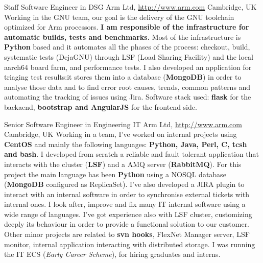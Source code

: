 \documentclass[10pt,a4paper,sans]{moderncv}
\begin{document}
    {Staff Software Engineer in DSG}
    {Arm Ltd, \url{http://www.arm.com}}
    {Cambridge, UK}{}
    {Working in the GNU team, our goal is the delivery of the GNU toolchain
    optimized for Arm processors. \textbf{I am responsible of the
    infrastructure for automatic builds, tests and benchmarks.} Most of the
    infrastructure is \textbf{Python} based and it automates all the phases of
    the process: checkout, build, systematic tests (DejaGNU) through LSF (Load
    Sharing Facility) and the local aarch64 board farm, and performance tests.
    I also developed an application for triaging test results:it stores them
    into a database (\textbf{MongoDB}) in order to analyse those data and to
    find error root causes, trends, common patterns and automating the tracking
    of issues using Jira. Software stack used: \textbf{flask} for the backaend,
    \textbf{bootstrap and AngularJS} for the frontend side.}

    {Senior Software Engineer in Engineering IT}
    {Arm Ltd, \url{http://www.arm.com}}
    {Cambridge, UK}{}
    {Working in a team, I've worked on internal projects using \textbf{CentOS}
    and mainly the following languages: \textbf{Python, Java, Perl, C, tcsh and
    bash}. I developed from scratch a reliable and fault tolerant application
    that interacts with the cluster (\textbf{LSF}) and a AMQ server
    (\textbf{RabbitMQ}). For this project the main language has been
    \textbf{Python} using a NOSQL database (\textbf{MongoDB} configured as
    ReplicaSet). I've also developed a JIRA plugin to interact with an internal
    software in order to synchronise external tickets with internal ones. I
    look after, improve and fix many IT internal software using a wide range of
    languages. I've got experience also with LSF cluster, customizing deeply
    its behaviour in order to provide a functional solution to our customer.
    Other minor projects are related to \textbf{svn hooks}, FlexNet Manager
    server, LSF monitor, internal application interacting with distributed
    storage. I was running the IT ECS (\textit{Early Career Scheme}), for
    hiring graduates and interns.}
\end{document}
